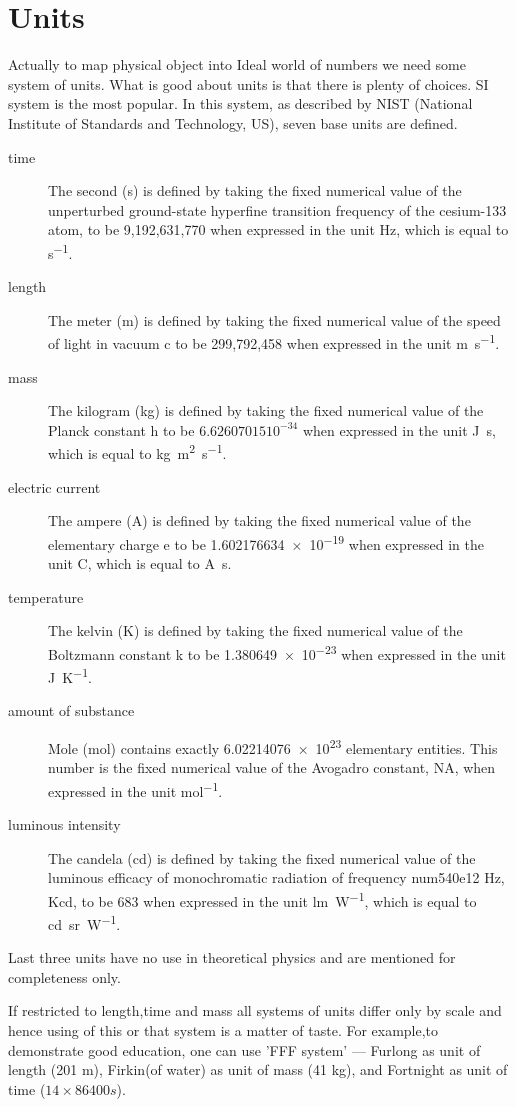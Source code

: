 \section{Units}
\label{units}
Actually to map  physical object into Ideal world of numbers we need some system of units.
What is good about units is that there is plenty of choices.
SI system is the most popular. 
In this system, as described by NIST (National Institute of Standards and Technology, US),
seven base units are defined.
\begin{description}
    \item [time] The second (s) is defined by taking the fixed numerical 
 value of the unperturbed ground-state hyperfine transition 
 frequency of the cesium-133 atom, to be 9,192,631,770 
        when expressed in the unit Hz, which is equal to \unit{ s^{-1}}.
    \item [length] The meter (m) is defined by taking the fixed numerical value of
the speed of light in vacuum c to be 299,792,458 
when expressed in the unit \unit{m.s^{-1}}.
\item [mass] The kilogram (kg) is defined by taking the fixed numerical 
value of the Planck constant h to be $6.62607015 10^{-34}$
when expressed in the unit \unit{J.s}, which is equal to \unit{kg.m^2.s^{-1}}.
\item [electric current] The ampere (A) is defined by taking the fixed numerical value of 
 the elementary charge e to be \num{1.602176634e-19} when expressed in the unit C,
        which is equal to \unit{A.s}.
\item [temperature] The kelvin (K) is defined by taking the fixed numerical value of
    the Boltzmann constant k to be \num{1.380 649e-23} when expressed in the unit \unit{J.K^{-1}}.
\item [amount of substance] Mole (mol) contains exactly \num{6.02214076e23} 
    elementary entities. This number is the fixed numerical value of the Avogadro constant, 
        NA, when expressed in the unit \unit{mol^{-1}}.
\item [luminous intensity] The candela (cd) is defined by taking the fixed numerical 
    value of the luminous efficacy of monochromatic radiation of frequency num{540e12} Hz, Kcd, 
        to be 683 when expressed in the unit \unit{lm.W^{-1}}, which is equal to \unit{cd.sr.W^{-1}}. 
\end{description}
Last three units have no use in theoretical physics and are mentioned for completeness only.

If restricted to length,time and mass all systems of units  differ only 
by scale and hence using of this or that system is a matter of taste. 
For example,to demonstrate good education, one can use 'FFF system' --- Furlong as unit of length (201 m),
Firkin(of water) as unit of mass (41 kg), and Fortnight as unit of time ($ 14\times 86400 s $). 

